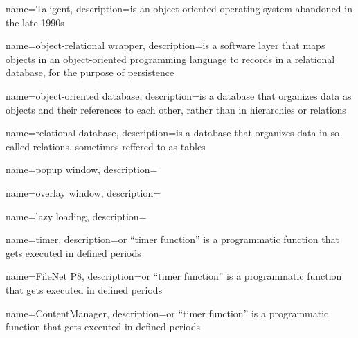 
{
	name=Taligent,
	description={is an object-oriented operating system abandoned in the late 1990s}
}

{
	name=object-relational wrapper,
	description={is a software layer that maps objects in an object-oriented programming language to records in a relational database, for the purpose of persistence}
}

{
	name=object-oriented database,
	description={is a database that organizes data as objects and their references to each other, rather than in hierarchies or relations}
}

{
	name=relational database,
	description={is a database that organizes data in so-called relations, sometimes reffered to as tables}
}

{
	name=popup window,
	description={}
}

{
	name=overlay window,
	description={}
}

{
	name=lazy loading,
	description={}
}

{
	name=timer,
	description={or ``timer function'' is a programmatic function that gets executed in defined periods}
}

{
	name=FileNet P8,
	description={or ``timer function'' is a programmatic function that gets executed in defined periods}
}

{
	name=ContentManager,
	description={or ``timer function'' is a programmatic function that gets executed in defined periods}
}